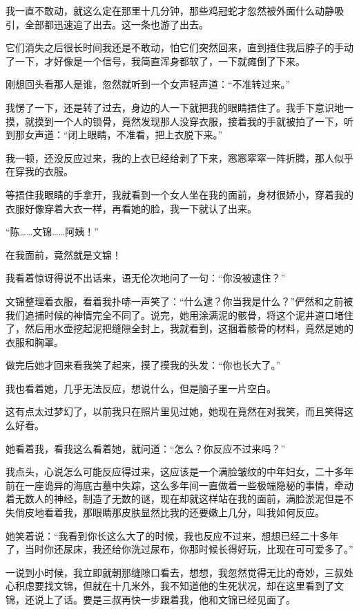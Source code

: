我一直不敢动，就这么定在那里十几分钟，那些鸡冠蛇才忽然被外面什么动静吸引，全部都迅速追了出去。这一条也游了出去。

它们消失之后很长时间我还是不敢动，怕它们突然回来，直到捂住我后脖子的手动了一下，才好像是一个信号，我简直浑身都软了，一下就瘫倒了下来。

刚想回头看那人是谁，忽然就听到一个女声轻声道：“不准转过来。”

我愣了一下，还是转了过去，身边的人一下就把我的眼睛捂住了。我手下意识地一摸，就摸到一个人的锁骨，竟然发现那人没穿衣服，接着我的手就被拍了一下，听到那女声道：“闭上眼睛，不准看，把上衣脱下来。”

我一顿，还没反应过来，我的上衣已经给剥了下来，窸窸窣窣一阵折腾，那人似乎在穿我的衣服。

等捂住我眼睛的手拿开，我就看到一个女人坐在我的面前，身材很娇小，穿着我的衣服好像穿着大衣一样，再看她的脸，我一下就认了出来。

“陈……文锦……阿姨！”

在我面前，竟然就是文锦！

我看着惊讶得说不出话来，语无伦次地问了一句：“你没被逮住？”

文锦整理着衣服，看着我扑哧一声笑了：“什么逮？你当我是什么？”俨然和之前被我们追捕时候的神情完全不同了。说完，她用涂满泥的骸骨，将这个泥井道口堵住了，然后用水壶挖起泥把缝隙全封上，我就看到，这捆着骸骨的材料，竟然是她的衣服和胸罩。

做完后她才回来看我笑了起来，摸了摸我的头发：“你也长大了。”

我也看着她，几乎无法反应，想说什么，但是脑子里一片空白。

这有点太过梦幻了，以前我只在照片里见过她，她现在竟然在对我笑，而且笑得这么好看。

她看着我，看我这么看着她，就问道：“怎么？你反应不过来吗？”

我点头，心说怎么可能反应得过来，这应该是一个满脸皱纹的中年妇女，二十多年前在一座诡异的海底古墓中失踪，这么多年间一直做着一些极端隐秘的事情，牵动着无数人的神经，制造了无数的谜，现在却就这样站在我的面前，满脸淤泥但是不失俏皮地看着我，那眼睛那皮肤显然比我的还要嫩上几分，叫我如何反应。

她笑着说：“我看到你长这么大了的时候，我也反应不过来，想想已经二十多年了，当时你还尿床，我还给你洗过尿布，你那时候长得好玩，比现在可可爱多了。”

一说到小时候，我立即就朝那缝隙口看去，想想，我忽然觉得无比的奇妙，三叔处心积虑要找文锦，但就在十几米外，我不知道他的生死状况，却在这里看到了文锦，还说上了话。要是三叔再快一步跟着我，他和文锦已经见面了。

